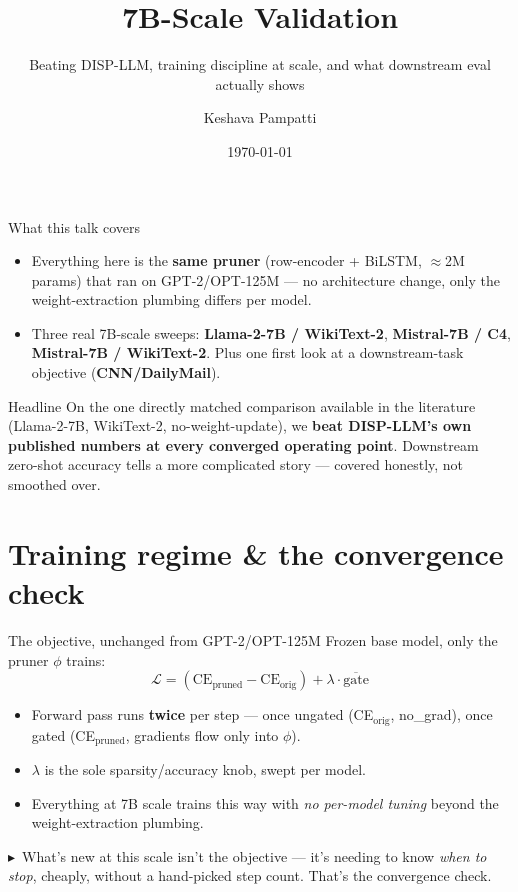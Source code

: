 \documentclass[10pt,aspectratio=169]{beamer}
\title{7B-Scale Validation}
\subtitle{Beating DISP-LLM, training discipline at scale, and what downstream eval actually shows}
\author{Keshava Pampatti}
\date{\today}
\newcommand{\tk}[1]{{\scriptsize \textcolor{accent}{$\blacktriangleright$}\ #1}}
\begin{document}
\maketitle

\begin{frame}{What this talk covers}
  \begin{itemize}
    \item Everything here is the \textbf{same pruner} (row-encoder + BiLSTM, $\approx$2M params) that ran on GPT-2/OPT-125M --- no architecture change, only the weight-extraction plumbing differs per model.
    \item Three real 7B-scale sweeps: \textbf{Llama-2-7B / WikiText-2}, \textbf{Mistral-7B / C4}, \textbf{Mistral-7B / WikiText-2}. Plus one first look at a downstream-task objective (\textbf{CNN/DailyMail}).
  \end{itemize}
  \vspace{0.6em}
  \begin{block}{Headline}
    On the one directly matched comparison available in the literature (Llama-2-7B, WikiText-2, no-weight-update), we \textbf{beat DISP-LLM's own published numbers at every converged operating point}. Downstream zero-shot accuracy tells a more complicated story --- covered honestly, not smoothed over.
  \end{block}
\end{frame}

\section{Training regime \& the convergence check}

\begin{frame}{The objective, unchanged from GPT-2/OPT-125M}
  Frozen base model, only the pruner $\phi$ trains:
  \[
    \mathcal{L} = (\text{CE}_{\text{pruned}} - \text{CE}_{\text{orig}}) + \lambda \cdot \overline{\text{gate}}
  \]
  \begin{itemize}
    \item Forward pass runs \textbf{twice} per step --- once ungated (CE$_{\text{orig}}$, no\_grad), once gated (CE$_{\text{pruned}}$, gradients flow only into $\phi$).
    \item $\lambda$ is the sole sparsity/accuracy knob, swept per model.
    \item Everything at 7B scale trains this way with \emph{no per-model tuning} beyond the weight-extraction plumbing.
  \end{itemize}
  \vspace{0.5em}
  \tk{What's new at this scale isn't the objective --- it's needing to know \emph{when to stop}, cheaply, without a hand-picked step count. That's the convergence check.}
\end{frame}
\end{document}
